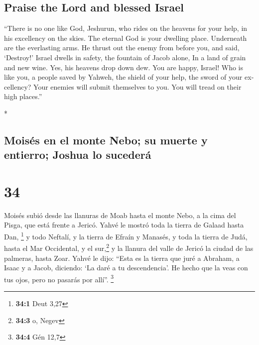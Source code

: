 \begin{paracol}{2}
\begin{otherlanguage}{english}
\hypertarget{praise-the-lord-and-blessed-israel}{%
\subsection{Praise the Lord and blessed
Israel}\label{praise-the-lord-and-blessed-israel}}

 ``There is no one like God, Jeshurun, who rides on the
heavens for your help, in his excellency on the skies. 
The eternal God is your dwelling place. Underneath are the everlasting
arms. He thrust out the enemy from before you, and said, `Destroy!'
 Israel dwells in safety, the fountain of Jacob alone, In
a land of grain and new wine. Yes, his heavens drop down dew.
 You are happy, Israel! Who is like you, a people saved
by Yahweh, the shield of your help, the sword of your excellency? Your
enemies will submit themselves to you. You will tread on their high
places.''

\end{otherlanguage}

\switchcolumn[0]*

\hypertarget{moisuxe9s-en-el-monte-nebo-su-muerte-y-entierro-joshua-lo-sucederuxe1}{%
\subsection{Moisés en el monte Nebo; su muerte y entierro; Joshua lo
sucederá}\label{moisuxe9s-en-el-monte-nebo-su-muerte-y-entierro-joshua-lo-sucederuxe1}}

\hypertarget{section-66}{%
\section{34}\label{section-66}}

 Moisés subió desde las llanuras de Moab hasta el monte
Nebo, a la cima del Pisga, que está frente a Jericó. Yahvé le mostró
toda la tierra de Galaad hasta Dan, \footnote{\textbf{34:1} Deut 3,27}
 y todo Neftalí, y la tierra de Efraín y Manasés, y toda
la tierra de Judá, hasta el Mar Occidental,  y el
sur,\footnote{\textbf{34:3} o, Negev} y la llanura del valle de Jericó
la ciudad de las palmeras, hasta Zoar.  Yahvé le dijo:
``Esta es la tierra que juré a Abraham, a Isaac y a Jacob, diciendo: `La
daré a tu descendencia'. He hecho que la veas con tus ojos, pero no
pasarás por allí''. \footnote{\textbf{34:4} Gén 12,7}


\end{paracol}
